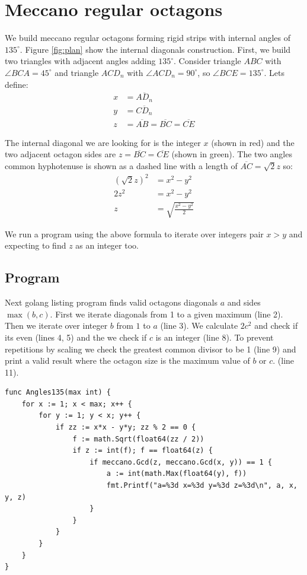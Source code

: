 \documentclass[11pt]{article}
\begin{document}
\section{Meccano regular octagons}

We build meccano regular octagons forming rigid strips with internal angles of $135^\circ{}$. 
Figure \ref{fig:plan} show the internal diagonals construction. First, we build two
triangles with adjacent angles adding $135^\circ{}$. Consider triangle $ABC$ with
$\angle{BCA} = 45^\circ{}$ and triangle $ACD_n$ with $\angle{ACD_n} = 90^\circ{}$,
so $\angle{BCE} = 135^\circ{}$. Lets define:
\begin{align*}
x &= \overline{AD_n}\\
y &= \overline{CD_n}\\
z &= \overline{AB} = \overline{BC} = \overline{CE}
\end{align*}

The internal diagonal we are looking for is the integer $x$ (shown in red) and the two
adjacent octagon sides are $z = \overline{BC} = \overline{CE}$ (shown in green).
The two angles common hyphotenuse is shown as a dashed line with a length of $\overline{AC} = \sqrt{2}z$ so:
\begin{align*}
(\sqrt{2}z)^2 &= x^2 - y^2\\
         2z^2 &= x^2 - y^2\\
            z &= \sqrt{\frac{x^2 - y^2}{2}}
\end{align*}

We run a program using the above formula to iterate over integers pair $x > y$ and 
expecting to find $z$ as an integer too.

\subsection{Program}
Next golang listing program finds valid octagons diagonals $a$ and sides $\max(b,c)$.
First we iterate diagonals from 1 to a given maximum (line 2).
Then we iterate over integer $b$ from $1$ to $a$ (line 3).
We calculate $2c^2$ and check if its even (lines 4, 5) and the we check
if $c$ is an integer (line 8). To prevent repetitions by scaling we check
the greatest common divisor to be 1 (line 9) and print a valid result 
where the octagon size is the maximum value of $b$ or $c$. (line 11).
\begin{lstlisting}
func Angles135(max int) {
	for x := 1; x < max; x++ {
		for y := 1; y < x; y++ {
			if zz := x*x - y*y; zz % 2 == 0 {
				f := math.Sqrt(float64(zz / 2))
				if z := int(f); f == float64(z) {
					if meccano.Gcd(z, meccano.Gcd(x, y)) == 1 {
						a := int(math.Max(float64(y), f))
						fmt.Printf("a=%3d x=%3d y=%3d z=%3d\n", a, x, y, z)
					}
				}
			}
		}
	}
}
\end{lstlisting}
\end{document}
